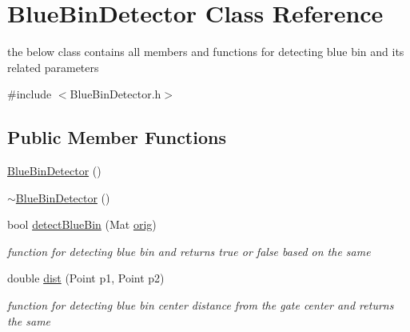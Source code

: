 \hypertarget{classBlueBinDetector}{}\section{Blue\+Bin\+Detector Class Reference}
\label{classBlueBinDetector}


the below class contains all members and functions for detecting blue bin and its related parameters  




{\ttfamily \#include $<$Blue\+Bin\+Detector.\+h$>$}

\subsection*{Public Member Functions}
\begin{DoxyCompactItemize}
\item 
\hyperlink{classBlueBinDetector_ad082c0687a01c1868cb6e3478ba3f774}{Blue\+Bin\+Detector} ()
\item 
\hyperlink{classBlueBinDetector_a482faf6ce9a83043b1ed0c53f708712e}{$\sim$\+Blue\+Bin\+Detector} ()
\item 
bool \hyperlink{classBlueBinDetector_ab428c2aa1474c1bb0c1aceac4bc4b028}{detect\+Blue\+Bin} (Mat \hyperlink{qualification__task_8cpp_ae544386e0f095e03d639cf884b7a8a1b}{orig})
\begin{DoxyCompactList}\small\item\em function for detecting blue bin and returns true or false based on the same \end{DoxyCompactList}\item 
double \hyperlink{classBlueBinDetector_a5e63ca51780f42539fc2ff6c8cc45c3f}{dist} (Point p1, Point p2)
\begin{DoxyCompactList}\small\item\em function for detecting blue bin center distance from the gate center and returns the same \end{DoxyCompactList}\end{DoxyCompactItemize}
